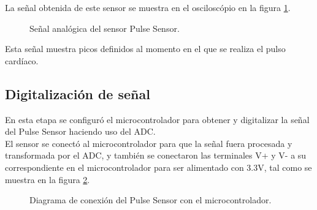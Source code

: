 La señal obtenida de este sensor se muestra en el osciloscópio en la figura \ref{fig:PulseSensor3}.\\

\begin{figure}[htbp!]
	\centering
	\caption{Señal analógica del sensor Pulse Sensor.}
	\label{fig:PulseSensor3}
\end{figure}

Esta señal muestra picos definidos al momento en el que se realiza el pulso cardíaco.

\newpage	
\subsection{Digitalización de señal}
En esta etapa se configuró el microcontrolador para obtener y digitalizar la señal del Pulse Sensor haciendo uso del ADC. \\

El sensor se conectó al microcontrolador para que la señal fuera procesada y transformada por el ADC, y también se conectaron las terminales V+ y V- a su correspondiente en el microcontrolador para ser alimentado con 3.3V, tal como se muestra en la figura \ref{fig:ConexionPulseSensor}. \\

\begin{figure}[htbp!]
	\centering
	\caption{Diagrama de conexión del Pulse Sensor con el microcontrolador.}
	\label{fig:ConexionPulseSensor}
\end{figure}

